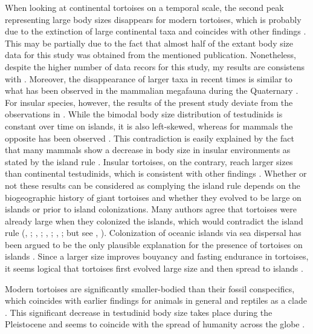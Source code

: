 When looking at continental tortoises on a temporal scale, the second peak representing large body sizes disappears for modern tortoises, which is probably due to the extinction of large continental taxa and coincides with other findings \citep{Itescu2014}. This may be partially due to the fact that almost half of the extant body size data for this study was obtained from the mentioned publication. Nonetheless, despite the higher number of data recors for this study, my results are consistens with \cite{Itescu2014}.
Moreover, the disappearance of larger taxa in recent times is similar to what has been observed in the mammalian megafauna during the Quaternary \citep{Lyons2008}.
For insular species, however, the results of the present study deviate from the observations in \cite{Lyons2008}. While the bimodal body size distribution of testudinids is constant over time on islands, it is also left-skewed, whereas for mammals the opposite has been observed \citep{Lyons2008}. This contradiction is easily explained by the fact that many mammals show a decrease in body size in insular environments as stated by the island rule \citep{Foster1964}. Insular tortoises, on the contrary, reach larger sizes than continental testudinids, which is consistent with other findings \cite{Itescu2014,Jaffe2011a,Angielczyk2015}.
Whether or not these results can be considered as complying the island rule depends on the biogeographic history of giant tortoises and whether they evolved to be large on islands or prior to island colonizations. Many authors agree that tortoises were already large when they colonized the islands, which would contradict the island rule (\citeauthor{Itescu2014}, \citeyear{Itescu2014}; \citeauthor{Cheke2016}, \citeyear{Cheke2016}; \citeauthor{Gerlach2006}, \citeyear{Gerlach2006}; \citeauthor{Caccone1999}, \citeyear{Caccone1999}; but see \citeauthor{Jaffe2011a}, \citeyear{Jaffe2011a}).
Colonization of oceanic islands via sea dispersal has been argued to be the only plausible explanation for the presence of tortoises on islands \citep{Cheke2016}. Since a larger size improves bouyancy and fasting endurance in tortoises, it seems logical that tortoises first evolved large size and then spread to islands \citep{Patterson1973,Gerlach2006,Cheke2016,Pritchard1996,Jaffe2011a}.

Modern tortoises are significantly smaller-bodied than their fossil conspecifics, which coincides with earlier findings for animals in general \citep{Blackburn1994} and reptiles as a clade \citep{Smith2016}. This significant decrease in testudinid body size takes place during the Pleistocene and seems to coincide with the spread of humanity across the globe \citep{Rhodin2015}.




